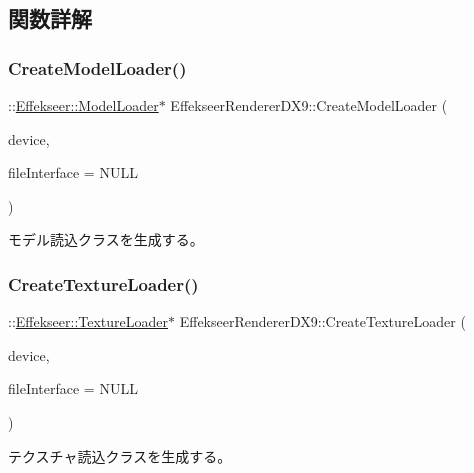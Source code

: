 \subsection{関数詳解}
\mbox{\label{namespace_effekseer_renderer_d_x9_a496d0398b86f68f4010efa58df8c264a}} 
\subsubsection{\texorpdfstring{Create\+Model\+Loader()}{CreateModelLoader()}}
{\footnotesize\ttfamily \+::\mbox{\hyperlink{class_effekseer_1_1_model_loader}{Effekseer\+::\+Model\+Loader}}$\ast$ Effekseer\+Renderer\+D\+X9\+::\+Create\+Model\+Loader (\begin{DoxyParamCaption}\item[{L\+P\+D\+I\+R\+E\+C\+T3\+D\+D\+E\+V\+I\+C\+E9}]{device,  }\item[{\+::\mbox{\hyperlink{class_effekseer_1_1_file_interface}{Effekseer\+::\+File\+Interface}} $\ast$}]{file\+Interface = {\ttfamily NULL} }\end{DoxyParamCaption})}



モデル読込クラスを生成する。 

\mbox{\label{namespace_effekseer_renderer_d_x9_a89d8f828f46e0eb46094b96203a6f7d4}} 
\subsubsection{\texorpdfstring{Create\+Texture\+Loader()}{CreateTextureLoader()}}
{\footnotesize\ttfamily \+::\mbox{\hyperlink{class_effekseer_1_1_texture_loader}{Effekseer\+::\+Texture\+Loader}}$\ast$ Effekseer\+Renderer\+D\+X9\+::\+Create\+Texture\+Loader (\begin{DoxyParamCaption}\item[{L\+P\+D\+I\+R\+E\+C\+T3\+D\+D\+E\+V\+I\+C\+E9}]{device,  }\item[{\+::\mbox{\hyperlink{class_effekseer_1_1_file_interface}{Effekseer\+::\+File\+Interface}} $\ast$}]{file\+Interface = {\ttfamily NULL} }\end{DoxyParamCaption})}



テクスチャ読込クラスを生成する。 

